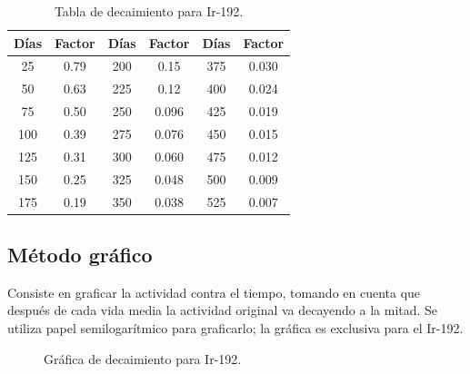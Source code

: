 \begin{table}[ht]
\centering
\caption{Tabla de decaimiento para Ir-192.}
\label{tab:decaimiento-ir192}
\begin{tabular}{|c|c||c|c||c|c|}
\hline
\textbf{Días} & \textbf{Factor} & \textbf{Días} & \textbf{Factor} & \textbf{Días} & \textbf{Factor} \\
\hline
25  & 0.79  & 200 & 0.15  & 375 & 0.030 \\
50  & 0.63  & 225 & 0.12  & 400 & 0.024 \\
75  & 0.50  & 250 & 0.096 & 425 & 0.019 \\
100 & 0.39  & 275 & 0.076 & 450 & 0.015 \\
125 & 0.31  & 300 & 0.060 & 475 & 0.012 \\
150 & 0.25  & 325 & 0.048 & 500 & 0.009 \\
175 & 0.19  & 350 & 0.038 & 525 & 0.007 \\
\hline
\end{tabular}
\end{table}

\subsection{Método gráfico}

Consiste en graficar la actividad contra el tiempo, tomando en cuenta que después de cada vida media la actividad original va decayendo a la mitad. Se utiliza papel semilogarítmico para graficarlo; la gráfica es exclusiva para el Ir-192.

\begin{figure}[ht]
  \centering
  \caption{Gráfica de decaimiento para Ir-192.}
  \label{fig:grafica-ir192}
\end{figure}
